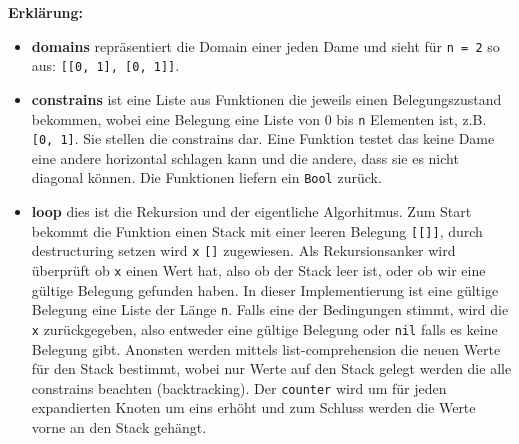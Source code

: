 \documentclass[a4paper,10pt]{article}
\begin{document}
\textbf{Erklärung:}
\begin{itemize}
  \item \textbf{domains} repräsentiert die Domain einer jeden Dame und sieht für \texttt{n = 2} so aus: \texttt{[[0, 1], [0, 1]]}.
  \item \textbf{constrains} ist eine Liste aus Funktionen die jeweils einen Belegungszustand bekommen, wobei eine Belegung eine Liste von 0 bis \texttt{n} Elementen ist, z.B. \texttt{[0, 1]}. Sie stellen die constrains dar. Eine Funktion testet das keine Dame eine andere horizontal schlagen kann und die andere, dass sie es nicht diagonal können. Die Funktionen liefern ein \texttt{Bool} zurück.
  \item \textbf{loop} dies ist die Rekursion und der eigentliche Algorhitmus. Zum Start bekommt die Funktion einen Stack mit einer leeren Belegung \texttt{[[]]}, durch destructuring setzen wird \texttt{x} \texttt{[]} zugewiesen. Als Rekursionsanker wird überprüft ob \texttt{x} einen Wert hat, also ob der Stack leer ist, oder ob wir eine gültige Belegung gefunden haben. In dieser Implementierung ist eine gültige Belegung eine Liste der Länge \texttt{n}. Falls eine der Bedingungen stimmt, wird die \texttt{x} zurückgegeben, also entweder eine gültige Belegung oder \texttt{nil} falls es keine Belegung gibt. Anonsten werden mittels list-comprehension die neuen Werte für den Stack bestimmt, wobei nur Werte auf den Stack gelegt werden die alle constrains beachten (backtracking). Der \texttt{counter} wird um für jeden expandierten Knoten um eins erhöht und zum Schluss werden die Werte vorne an den Stack gehängt.
\end{itemize}
\newpage
\end{document}
